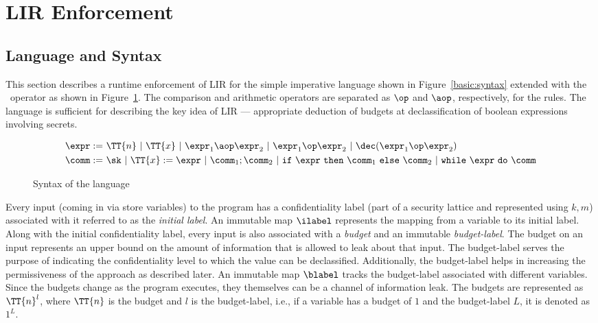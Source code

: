\section{LIR Enforcement}
\label{sec:formalization}

\subsection{Language and Syntax}
This section describes a runtime enforcement of LIR for the simple
imperative language shown in Figure~\ref{basic:syntax} extended with
the \dec~operator as shown in Figure~\ref{fig:syntaxLIR}. The
comparison and arithmetic operators are separated as $\op$ and $\aop$,
respectively, for the rules. The language
is sufficient for describing the key idea of LIR --- appropriate
deduction of budgets at declassification of boolean expressions involving
secrets. 

\begin{figure}[!htbp]
\begin{align*}
  \expr	:=~&\TT{n}~\arrowvert~\TT{x}~\arrowvert~\expr_1 \aop \expr_2~\arrowvert~
             \expr_1 \op \expr_2~\arrowvert~\dec(\expr_1 \op \expr_2)\\
  \comm	:=~&\sk~\arrowvert~\TT{x} :=
             \expr~\arrowvert~\comm_1;\comm_2~\arrowvert~\texttt{if}~\expr~\texttt{then}~\comm_1~\texttt{else}~\comm_2~\arrowvert~ 
   \texttt{while}~\expr~\texttt{do}~\comm
\end{align*}
\caption{Syntax of the language}
\label{fig:syntaxLIR}
\end{figure}

Every input (coming in via store variables) to the program has a confidentiality
label (part of a security lattice and represented using 
$k, m$) associated with it referred to as the \emph{initial label}. An
immutable map $\ilabel$ represents the mapping from a variable to
its initial label. Along with the initial confidentiality label, every
input is also associated with a \emph{budget} and an immutable
\emph{budget-label}. The budget on an input represents an upper bound 
on the amount of information that is allowed to leak about that
input. The budget-label serves the purpose of indicating the
confidentiality level to which the value can be
declassified. Additionally, the budget-label helps in increasing the 
permissiveness of the approach as described later. An immutable map
$\blabel$ tracks the budget-label associated with different variables.
Since the budgets change as the program executes, they themselves can
be a channel of information leak. The budgets are represented as
$\TT{n}^l$, where $\TT{n}$ is the budget and $l$ is the budget-label, i.e., if a
variable has a budget of $1$ and the budget-label $L$, it is denoted
as $1^L$.

